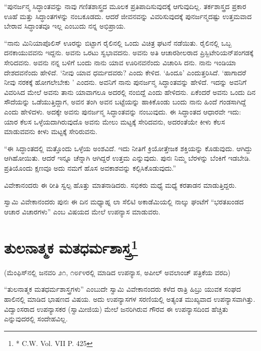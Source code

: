 “ಪುನರ್ಜನ್ಮ ಸಿದ್ಧಾಂತವನ್ನು ನಾವು ಗಣಿತಶಾಸ್ತ್ರದ ಮೂಲಕ ಪ್ರತಿಪಾದಿಸುವುದಕ್ಕೆ ಆಗುವುದಿಲ್ಲ. ತರ್ಕಶಾಸ್ತ್ರದ ಪ್ರಕಾರ ಊಹೆ ಮತ್ತು ಸಿದ್ಧಾಂತಗಳನ್ನು ನಂಬಕೂಡದು. ಆದರೆ ಜೀವನವನ್ನು ವಿವರಿಸುವುದಕ್ಕೆ ಪುನರ್ಜನ್ಮದಷ್ಟು ಉತ್ತಮವಾದ ಬೇರಾವ ಸಿದ್ಧಾಂತವೂ ಇಲ್ಲ ಎಂಬುದು ನನ್ನ ಅಭಿಪ್ರಾಯ.

“ನಾನು ಮಿನಿಯಾಪೊಲಿಸ್​ ಊರನ್ನು ಬಿಟ್ಟಾಗ ರೈಲಿನಲ್ಲಿ ಒಂದು ವಿಚಿತ್ರ ಘಟನೆ ನಡೆಯಿತು. ರೈಲಿನಲ್ಲಿ ಒಬ್ಬ ದನಕಾಯುವವನು ಇದ್ದನು. ಅವನು ಒರಟು ಸ್ವಭಾವದನು. ಅವನು ಅತಿ ಆಚಾರಶೀಲರಾದ ಪ್ರಿಸ್ಬಿಟೇರಿಯನ್​ ಪಂಗಡಕ್ಕೆ ಸೇರಿದವನು. ಅವನು ನನ್ನ ಬಳಿಗೆ ಬಂದು ನಾನು ಯಾವ ಊರಿನವನೆಂದು ವಿಚಾರಿಸಿ ದನು. ನಾನು ಇಂಡಿಯಾ ದೇಶದವನೆಂದು ಹೇಳಿದೆ. ‘ನೀವು ಯಾವ ಧರ್ಮದವರು? ಎಂದು ಕೇಳಿದ. ‘ಹಿಂದೂ’ ಎಂದುತ್ತರಿಸಿದೆ. ‘ಹಾಗಾದರೆ ನೀವು ನರಕಕ್ಕೆ ಹೋಗಲೇಬೇಕು ’ ಎಂದನು. ಅವನಿಗೆ ನಾನು ಪುನರ್ಜನ್ಮ ಸಿದ್ಧಾಂತವನ್ನು ಹೇಳಿದೆ. ಇದನ್ನು ಅವನಿಗೆ ವಿವರಿಸಿದ ಮೇಲೆ ಅವನು ತಾನು ಯಾವಾಗಲೂ ಅದರಲ್ಲಿ ನಂಬಿದ್ದೆ ಎಂದು ಹೇಳಿದನು. ಏಕೆಂದರೆ ಅವನು ಒಂದು ದಿನ ಸೌದೆಯನ್ನು ಒಡೆಯುತ್ತಿದ್ದಾಗ, ಅವನ ತಂಗಿ ಅವನ ಬಟ್ಟೆಯನ್ನು ಹಾಕಿಕೊಂಡು ಬಂದು ನಾನು ಹಿಂದೆ ಗಂಡಸಾಗಿದ್ದೆ ಎಂದು ಹೇಳಿದಳು. ಅದಕ್ಕೇ ಅವನು ಪುನರ್ಜನ್ಮ ಸಿದ್ಧಾಂತವನ್ನು ನಂಬುವುದು. ಈ ಸಿದ್ಧಾಂತದ ಆಧಾರವೇ ಇದು: ಯಾರ ಕೆಲಸ ಒಳ್ಳೆಯದಾಗಿರುವುದೊ ಅವನು ಮೇಲು ಮಟ್ಟಕ್ಕೆ ಸೇರಿದವನು, ಅದರಂತೆಯೇ ಕೀಳು ಕೆಲಸ ಮಾಡುವವನು ಕೀಳು ಮಟ್ಟಕ್ಕೆ ಸೇರಿರುವನು.

“ಈ ಸಿದ್ಧಾಂತದಲ್ಲಿ ಮತ್ತೊಂದು ಒಳ್ಳೆಯ ಅಂಶವಿದೆ. ಇದು ನೀತಿಗೆ ಕ್ರಿಯೋತ್ತೇಜಕ ಶಕ್ತಿಯನ್ನು ಕೊಡುವುದು. ಆಗಿದ್ದು ಆಗಿಹೋಯಿತು. ಆದರೆ ಇನ್ನೂ ಚೆನ್ನಾಗಿ ಆಗಿದ್ದರೆ ಉತ್ತಮ ಎನ್ನುವುದು. ಪುನಃ ನಿಮ್ಮ ಬೆರಳನ್ನು ಬೆಂಕಿಗೆ ಇಡಬೇಡಿ. ಪ್ರತಿಯೊಂದು ಕ್ಷಣವೂ ಅದು ನಮಗೆ ಹೊಸ ಅವಕಾಶವನ್ನು ಕಲ್ಪಿಸಿಕೊಡುವುದು.”

\newpage

ವಿವೇಕಾನಂದರು ಈ ರೀತಿ ಸ್ವಲ್ಪ ಹೊತ್ತು ಮಾತನಾಡಿದರು. ಸಭಿಕರು ಮಧ್ಯೆ ಮಧ್ಯೆ ಕರತಾಡನ ಮಾಡುತ್ತಿದ್ದರು.

ಸ್ವಾಮಿ ವಿವೇಕಾನಂದರು ಪುನಃ ಈ ದಿನ ಮಧ್ಯಾಹ್ನ ಲಾ ಸೆಲಿಟಿ ಅಕಾಡೆಮಿಯಲ್ಲಿ ನಾಲ್ಕು ಘಂಟೆಗೆ “ಭರತಖಂಡದ ಆಚಾರ ವಿಚಾರಗಳು” ಎಂಬ ವಿಷಯದ ಮೇಲೆ ಉಪನ್ಯಾಸ ಮಾಡುವರು.


\section[ತುಲನಾತ್ಮಕ ಮತಧರ್ಮಶಾಸ್ತ್ರ]{ತುಲನಾತ್ಮಕ ಮತಧರ್ಮಶಾಸ್ತ್ರ\protect\footnote{* C.W. Vol. VII P. 425}}

\begin{center}
(ಮೆಂಫಿಸ್​ನಲ್ಲಿ ಜನವರಿ ೨೧, ೧೮೯೪ರಲ್ಲಿ ಮಾಡಿದ ಉಪನ್ಯಾಸ, ಅಪೀಲ್​ ಅವಲಾಂಚ್​ ಪತ್ರಿಕೆಯ ವರದಿ)
\end{center}

\vskip -0.3cm

“ತುಲನಾತ್ಮಕ ಮತಧರ್ಮಶಾಸ್ತ್ರಗಳು” ಎಂಬುದೇ ಸ್ವಾಮಿ ವಿವೇಕಾನಂದರು ಕಳೆದ ರಾತ್ರಿ ಹಿಬ್ರು ಯುವಕ ಸಂಘದ ಹಾಲಿನಲ್ಲಿ ಮಾಡಿದ ಭಾಷಣದ ವಿಷಯ. ಅದು ಉಪನ್ಯಾಸಗಳ ಸರಣಿಯಲ್ಲಿ ಅತ್ಯಂತ ಮುಖ್ಯವಾದ ಉಪನ್ಯಾಸವಾಗಿತ್ತು. ವಿದ್ವಾಂಸರಾದ ಉಪನ್ಯಾಸಕರ (ಸ್ವಾಮೀಜಿಯ) ಮೇಲೆ ಜನರಿಗಿರುವ ಗೌರವ ಈ ಉಪನ್ಯಾಸದಿಂದ ಹೆಚ್ಚಿತು ಎನ್ನುವುದರಲ್ಲಿ ಸಂದೇಹವಿಲ್ಲ.

